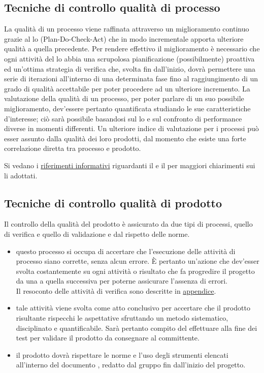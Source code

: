 \documentclass[a4paper, titlepage]{article}
\begin{document}
\subsection{Tecniche di controllo qualità di processo}
La qualità di un processo viene raffinata attraverso un miglioramento continuo grazie al lo  (Plan-Do-Check-Act) che in modo incrementale apporta ulteriore qualità a quella precedente. Per rendere effettivo il miglioramento è necessario che ogni attività del lo abbia una scrupolosa pianificazione (possibilmente) proattiva ed un'ottima strategia di verifica che, svolta fin dall'inizio, dovrà permettere una serie di iterazioni all'interno di una determinata fase fino al raggiungimento di un grado di qualità accettabile per poter procedere ad un ulteriore incremento.
\newline La valutazione della qualità di un processo, per poter parlare di un suo possibile miglioramento, dev'essere pertanto quantificata studiando le sue caratteristiche d'interesse; ciò sarà possibile basandosi sul lo  e sul confronto di performance diverse in momenti differenti.
\newline Un ulteriore indice di valutazione per i processi può esser assunto dalla qualità dei loro prodotti, dal momento che esiste una forte correlazione diretta tra processo e prodotto.

Si vedano i \hyperref[rifinfo]{riferimenti informativi} riguardanti il  e il  per maggiori chiarimenti sui li adottati.

\subsection{Tecniche di controllo qualità di prodotto}
Il controllo della qualità del prodotto è assicurato da due tipi di processi, quello di verifica e quello di validazione e dal rispetto delle norme.
\begin{itemize}
\item {} questo processo si occupa di accertare che l'esecuzione delle attività di processo siano corrette, senza alcun errore. È pertanto un'azione che dev'esser svolta costantemente su ogni attività o risultato che fa progredire il progetto da una  a quella successiva per poterne assicurare l'assenza di errori.
\\ Il resoconto delle attività di verifica sono descritte in \hyperref[app:valtest]{appendice}.
\\
\item {} tale attività viene svolta come atto conclusivo per accertare che il prodotto risultante rispecchi le aspettative sfruttando un metodo sistematico, disciplinato e quantificabile. Sarà pertanto compito del  effettuare alla fine dei test per validare il prodotto da consegnare al committente.
\\
\item {} il prodotto dovrà rispettare le norme e l'uso degli strumenti elencati all'interno del documento , redatto dal gruppo fin dall'inizio del progetto.
\end{itemize}
\end{document}
